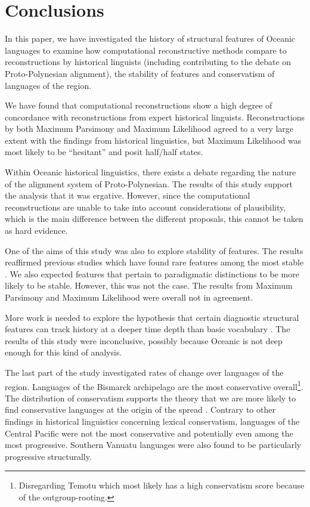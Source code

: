 \documentclass[a4paper,10pt]{article} %
\begin{document}
%

\section{Conclusions}
In this paper, we have investigated the history of structural features of Oceanic languages to examine how computational reconstructive methods compare to reconstructions by historical linguists (including contributing to the debate on Proto-Polynesian alignment), the stability of features and conservatism of languages of the region.

We have found that computational reconstructions show a high degree of concordance with reconstructions from expert historical linguists. Reconstructions by both Maximum Parsimony and Maximum Likelihood agreed to a very large extent with the findings from historical linguistics, but Maximum Likelihood was most likely to be ``hesitant'' and posit half/half states.

Within Oceanic historical linguistics, there exists a debate regarding the nature of the alignment system of Proto-Polynesian. The results of this study support the analysis that it was ergative. However, since the computational reconstructions are unable to take into account considerations of plausibility, which is the main difference between the different proposals, this cannot be taken as hard evidence.

One of the aims of this study was also to explore stability of features. The results reaffirmed previous studies which have found rare features among the most stable \citep{dediu2013some}. We also expected features that pertain to paradigmatic distinctions to be more likely to be stable. However, this was not the case. The results from Maximum Parsimony and Maximum Likelihood were overall not in agreement.

More work is needed to explore the hypothesis that certain diagnostic structural features can track history at a deeper time depth than basic vocabulary \citep[c.f.][]{nichols1998origin}. The results of this study were inconclusive, possibly because Oceanic is not deep enough for this kind of analysis.

The last part of the study investigated rates of change over languages of the region. Languages of the Bismarck archipelago are the most conservative overall\footnote{Disregarding Temotu which most likely has a high conservatism score because  of the outgroup-rooting.}. The distribution of conservatism supports the theory that we are more likely to find conservative languages at the origin of the spread  \citep[119]{lynchrosscrowleyinternalsubgroupingoceanic}. Contrary to other findings in historical linguistics concerning lexical conservatism, languages of the Central Pacific were not the most conservative and potentially even among the most progressive. Southern Vanuatu languages were also found to be particularly progressive structurally.
\end{document}

